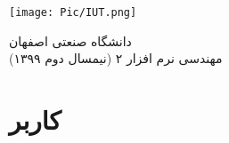 \documentclass{article}
\title{\lr{User Story}}
\author{
	مریم سعیدمهر \\
	شماره دانشجویی : ۹۶۲۹۳۷۳
	\and
	ساجده نیک نداف \\
	شماره دانشجویی : ۹۶۳۷۴۵۳
	\and
	مرضیه علیدادی \\
	شماره دانشجویی : ۹۶۳۱۹۸۳
}
\begin{document}
	
\begin{minipage}{0.1\textwidth}
	\texttt{[image: Pic/IUT.png]}
\end{minipage}
\hfill
\begin{minipage}{0.9\textwidth}\raggedleft
دانشگاه صنعتی اصفهان\\
مهندسی نرم افزار ۲ (نیمسال دوم ۱۳۹۹)\\
\end{minipage}

\makepertitle

\section{کاربر}
\end{document}
